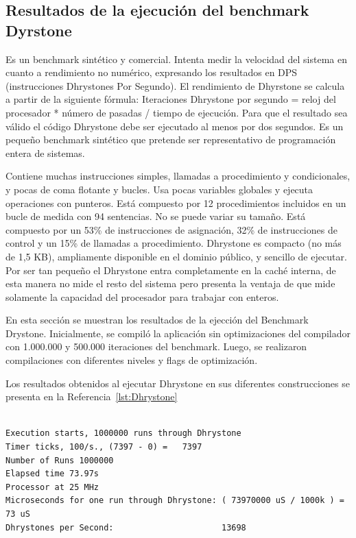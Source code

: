 \newpage

		\subsection{Resultados de la ejecución del benchmark Dyrstone}
		
		Es un benchmark sintético y comercial. Intenta medir la velocidad del sistema en cuanto a rendimiento no numérico, expresando los
		resultados en DPS (instrucciones Dhrystones Por Segundo). El rendimiento de Dhyrstone se calcula a partir de la siguiente fórmula: Iteraciones
		Dhrystone por segundo = reloj del procesador * número de pasadas / tiempo de ejecución. Para que el resultado sea válido el código Dhrystone debe
		ser ejecutado al menos por dos segundos. Es un pequeño benchmark sintético que pretende ser representativo de programación entera de
		sistemas. 
		
		Contiene muchas instrucciones simples, llamadas a procedimiento y condicionales, y pocas de coma flotante y bucles. Usa pocas variables globales y
		ejecuta operaciones con punteros. Está compuesto por 12 procedimientos incluidos en un bucle de medida con 94 sentencias. No se puede variar su
		tamaño. Está compuesto por un 53\% de instrucciones de asignación, 32\% de instrucciones de control y un 15\% de llamadas a procedimiento.
		Dhrystone es compacto (no más de 1,5 KB), ampliamente disponible en el dominio público, y sencillo de ejecutar. Por ser tan pequeño el Dhrystone
		entra completamente en la caché interna, de esta manera no mide el resto del sistema pero presenta la ventaja de que mide solamente la capacidad
		del procesador para trabajar con enteros.

		En esta sección se muestran los resultados de la ejección del Benchmark Drystone. Inicialmente, se compiló la aplicación sin optimizaciones del
		compilador con 1.000.000 y 500.000 iteraciones del benchmark. Luego, se realizaron compilaciones con diferentes niveles y flags de optimización. 

		Los resultados obtenidos al ejecutar Dhrystone en sus diferentes construcciones se presenta en la Referencia~\ref{lst:Dhrystone}

\begin{lstlisting}[frame=single,caption={Sin optimizaciones },label={lst:Dhrystone},breaklines]

Execution starts, 1000000 runs through Dhrystone
Timer ticks, 100/s., (7397 - 0) =	7397
Number of Runs 1000000
Elapsed time 73.97s
Processor at 25 MHz
Microseconds for one run through Dhrystone: ( 73970000 uS / 1000k ) = 73 uS
Dhrystones per Second:                      13698 
\end{lstlisting}

